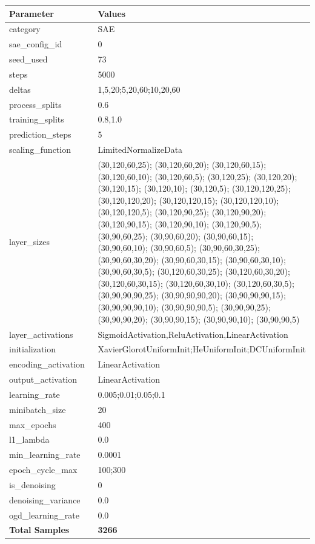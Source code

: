 \documentclass[a4paper,11pt,oneside]{article}
\theoremstyle{plain}
\theoremstyle{definition}
\begin{document}
	\begin{longtable}[H]{|p{0.3\linewidth}|p{0.7\linewidth}|} \hline 			\rowcolor{beaublue}\textbf{Parameter} &\textbf{Values} \\\hline{category} & {SAE} \\\hline
		{sae\_config\_id} & {0} \\\hline
		{seed\_used} & {73} \\\hline
		{steps} & {5000} \\\hline
		{deltas} & {1,5,20;5,20,60;10,20,60} \\\hline
		{process\_splits} & {0.6} \\\hline
		{training\_splits} & {0.8,1.0} \\\hline
		{prediction\_steps} & {5} \\\hline
		{scaling\_function} & {LimitedNormalizeData} \\\hline
		{layer\_sizes} & {(30,120,60,25); (30,120,60,20); (30,120,60,15); (30,120,60,10); (30,120,60,5); (30,120,25); (30,120,20); (30,120,15); (30,120,10); (30,120,5); (30,120,120,25); (30,120,120,20); (30,120,120,15); (30,120,120,10); (30,120,120,5); (30,120,90,25); (30,120,90,20); (30,120,90,15); (30,120,90,10); (30,120,90,5); (30,90,60,25); (30,90,60,20); (30,90,60,15); (30,90,60,10); (30,90,60,5); (30,90,60,30,25); (30,90,60,30,20); (30,90,60,30,15); (30,90,60,30,10); (30,90,60,30,5); (30,120,60,30,25); (30,120,60,30,20); (30,120,60,30,15); (30,120,60,30,10); (30,120,60,30,5); (30,90,90,90,25); (30,90,90,90,20); (30,90,90,90,15); (30,90,90,90,10); (30,90,90,90,5); (30,90,90,25); (30,90,90,20); (30,90,90,15); (30,90,90,10); (30,90,90,5)} \\\hline
		{layer\_activations} & {SigmoidActivation,ReluActivation,LinearActivation} \\\hline
		{initialization} & {XavierGlorotUniformInit;HeUniformInit;DCUniformInit} \\\hline
		{encoding\_activation} & {LinearActivation} \\\hline
		{output\_activation} & {LinearActivation} \\\hline
		{learning\_rate} & {0.005;0.01;0.05;0.1} \\\hline
		{minibatch\_size} & {20} \\\hline
		{max\_epochs} & {400} \\\hline
		{l1\_lambda} & {0.0} \\\hline
		{min\_learning\_rate} & {0.0001} \\\hline
		{epoch\_cycle\_max} & {100;300} \\\hline
		{is\_denoising} & {0} \\\hline
		{denoising\_variance} & {0.0} \\\hline
		{ogd\_learning\_rate} & {0.0} \\\hline
		{\textbf{Total Samples}} & {\textbf{3266}} \\\hline
	\end{longtable}
\end{document}
